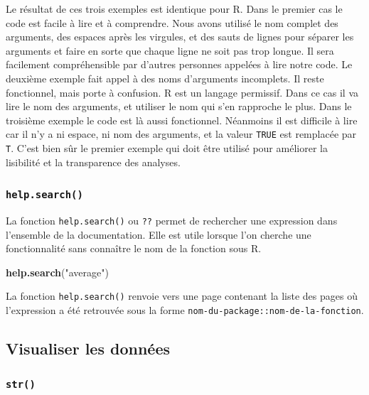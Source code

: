 \documentclass[
]{book}
\newenvironment{Shaded}{\begin{snugshade}}{\end{snugshade}}
\newcommand{\KeywordTok}[1]{\textcolor[rgb]{0.13,0.29,0.53}{\textbf{#1}}}
\newcommand{\NormalTok}[1]{#1}
\newcommand{\StringTok}[1]{\textcolor[rgb]{0.31,0.60,0.02}{#1}}
\begin{document}
Le résultat de ces trois exemples est identique pour R. Dans le premier cas le code est facile à lire et à comprendre. Nous avons utilisé le nom complet des arguments, des espaces après les virgules, et des sauts de lignes pour séparer les arguments et faire en sorte que chaque ligne ne soit pas trop longue. Il sera facilement compréhensible par d'autres personnes appelées à lire notre code. Le deuxième exemple fait appel à des noms d'arguments incomplets. Il reste fonctionnel, mais porte à confusion. R est un langage permissif. Dans ce cas il va lire le nom des arguments, et utiliser le nom qui s'en rapproche le plus. Dans le troisième exemple le code est là aussi fonctionnel. Néanmoins il est difficile à lire car il n'y a ni espace, ni nom des arguments, et la valeur \texttt{TRUE} est remplacée par \texttt{T}. C'est bien sûr le premier exemple qui doit être utilisé pour améliorer la lisibilité et la transparence des analyses.

\hypertarget{l015helpsearch}{%
\subsubsection{\texorpdfstring{\texttt{help.search()}}{help.search()}}\label{l015helpsearch}}

La fonction \texttt{help.search()} ou \texttt{??} permet de rechercher une expression dans l'ensemble de la documentation. Elle est utile lorsque l'on cherche une fonctionnalité sans connaître le nom de la fonction sous R.

\begin{Shaded}
\begin{Highlighting}[]
\KeywordTok{help.search}\NormalTok{(}\StringTok{"average"}\NormalTok{)}
\end{Highlighting}
\end{Shaded}

La fonction \texttt{help.search()} renvoie vers une page contenant la liste des pages où l'expression a été retrouvée sous la forme \texttt{nom-du-package::nom-de-la-fonction}.

\hypertarget{visualiser-les-donnuxe9es}{%
\subsection{Visualiser les données}\label{visualiser-les-donnuxe9es}}

\hypertarget{l015str}{%
\subsubsection{\texorpdfstring{\texttt{str()}}{str()}}\label{l015str}}
\end{document}
